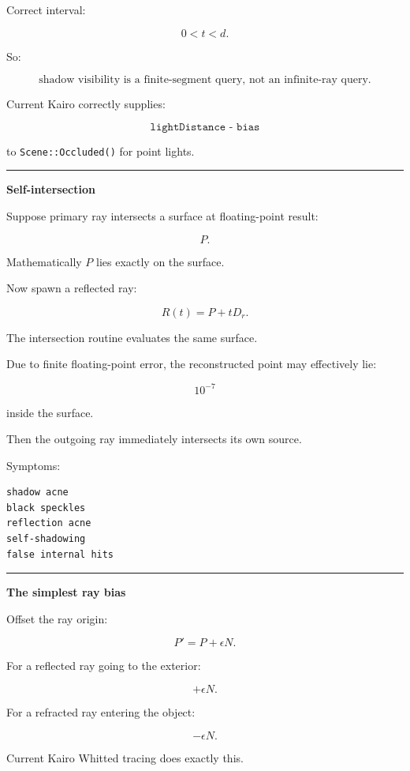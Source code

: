 Correct interval:

\[
0<t<d.
\]

So:

\[
\boxed{
\text{shadow visibility is a finite-segment query, not an infinite-ray query}.
}
\]

Current Kairo correctly supplies:

\[
\texttt{lightDistance - bias}
\]

to \texttt{Scene::Occluded()} for point lights.

\begin{center}\rule{0.5\linewidth}{0.5pt}\end{center}

\textbf{Self-intersection}

Suppose primary ray intersects a surface at floating-point result:

\[
P.
\]

Mathematically \(P\) lies exactly on the surface.

Now spawn a reflected ray:

\[
R(t)=P+tD_r.
\]

The intersection routine evaluates the same surface.

Due to finite floating-point error, the reconstructed point may effectively lie:

\[
10^{-7}
\]

inside the surface.

Then the outgoing ray immediately intersects its own source.

Symptoms:

\begin{verbatim}
shadow acne
black speckles
reflection acne
self-shadowing
false internal hits
\end{verbatim}

\begin{center}\rule{0.5\linewidth}{0.5pt}\end{center}

\textbf{The simplest ray bias}

Offset the ray origin:

\[
\boxed{
P'=P+\epsilon N.
}
\]

For a reflected ray going to the exterior:

\[
+\epsilon N.
\]

For a refracted ray entering the object:

\[
-\epsilon N.
\]

Current Kairo Whitted tracing does exactly this.

